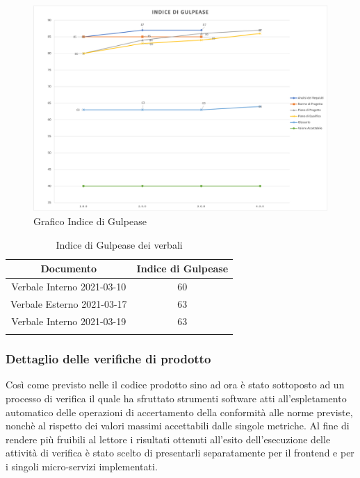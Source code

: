 \begin{center}
    \begin{figure}[!htb]
        \centering
        \includegraphics[scale=0.60]{res/images/ra/ra_gulpease.png}
        \caption{Grafico Indice di Gulpease}
    \end{figure}
    \begin{center}
        \begin{longtable}{|c|c|}
            \hline
            \rowcolor{lighter-grayer}
            \textbf{Documento}         & \textbf{Indice di Gulpease} \\
            \hline
            \endfirsthead

            \hline
            Verbale Interno 2021-03-10 & 60                          \\
            Verbale Esterno 2021-03-17 & 63                          \\      
            Verbale Interno 2021-03-19 & 63                          \\ 
            
            \hline
            \rowcolor{white}
            \caption{Indice di Gulpease dei verbali}
        \end{longtable}
    \end{center}
\end{center}

\subsubsection{Dettaglio delle verifiche di prodotto}

Così come previsto nelle  il codice prodotto sino ad ora è stato sottoposto ad un processo di verifica il quale 
ha sfruttato strumenti software atti all'espletamento automatico delle operazioni di accertamento della conformità alle norme previste, nonchè
al rispetto dei valori massimi accettabili dalle singole metriche.
Al fine di rendere più fruibili al lettore i risultati ottenuti all'esito dell'esecuzione delle attività di verifica è stato scelto di presentarli
separatamente per il frontend e per i singoli micro-servizi implementati.

